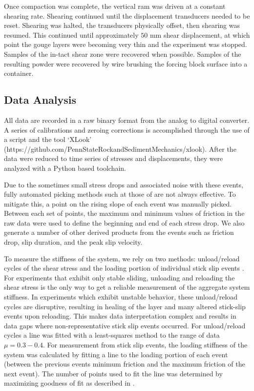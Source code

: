 Once compaction was complete, the vertical ram was driven at a constant shearing rate. Shearing continued until the displacement transducers needed to be reset. Shearing was halted, the transducers physically offset, then shearing was resumed. This continued until approximately $50$ mm shear displacement, at which point the gouge layers were becoming very thin and the experiment was stopped. Samples of the in-tact shear zone were recovered when possible. Samples of the resulting powder were recovered by wire brushing the forcing block surface into a container.

\subsection{Data Analysis}
All data are recorded in a raw binary format from the analog to digital converter. A series of calibrations and zeroing corrections is accomplished through the use of a script and the tool `XLook' (https://github.com/PennStateRockandSedimentMechanics/xlook). After the data were reduced to time series of stresses and displacements, they were analyzed with a Python based toolchain. 

Due to the sometimes small stress drops and associated noise with these events, fully automated picking methods such at those of \cite{leeman2015stiffness} are not always effective. To mitigate this, a point on the rising slope of each event was manually picked. Between each set of points, the maximum and minimum values of friction in the raw data were used to define the beginning and end of each stress drop. We also generate a number of other derived products from the events such as friction drop, slip duration, and the peak slip velocity.

To measure the stiffness of the system, we rely on two methods: unload/reload cycles of the shear stress and the loading portion of individual stick slip events \cite{leeman2016laboratory}. For experiments that exhibit only stable sliding, unloading and reloading the shear stress is the only way to get a reliable measurement of the aggregate system stiffness. In experiments which exhibit unstable behavior, these unload/reload cycles are disruptive, resulting in healing of the layer and many altered stick-slip events upon reloading. This makes data interpretation complex and results in data gaps where non-representative stick slip events occurred. For unload/reload cycles a line was fitted with a least-squares method to the range of data $\mu = 0.3 - 0.4$. For measurement from stick slip events, the loading stiffness of the system was calculated by fitting a line to the loading portion of each event (between the previous events minimum friction and the maximum friction of the next event). The number of points used to fit the line was determined by maximizing goodness of fit as described in \cite{leeman2015stiffness}.

